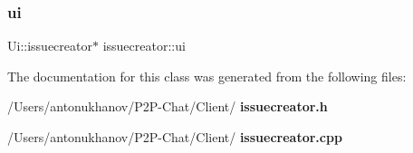 \mbox{\label{classissuecreator_ae85db2bae308918495f313ac058b006b}} 
\subsubsection{ui}
{\footnotesize\ttfamily Ui\+::issuecreator$\ast$ issuecreator\+::ui\hspace{0.3cm}{\ttfamily [private]}}



The documentation for this class was generated from the following files\+:\begin{DoxyCompactItemize}
\item 
/\+Users/antonukhanov/\+P2\+P-\/\+Chat/\+Client/\textbf{ issuecreator.\+h}\item 
/\+Users/antonukhanov/\+P2\+P-\/\+Chat/\+Client/\textbf{ issuecreator.\+cpp}\end{DoxyCompactItemize}
